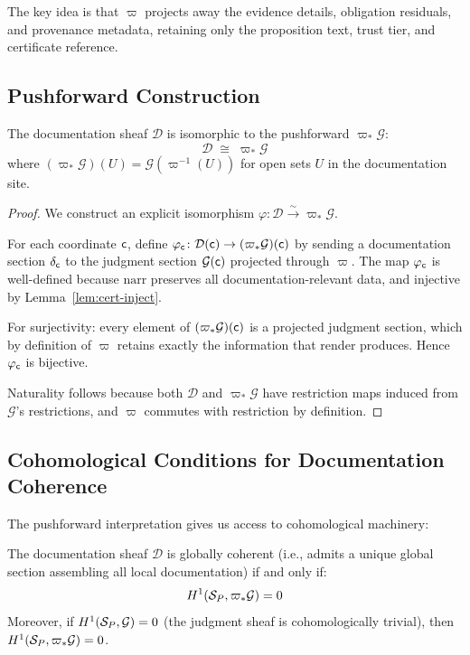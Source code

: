 \documentclass[11pt]{article}
\newcommand{\DocSheaf}{\mathcal{D}}
\newcommand{\DocSection}{\delta}
\newcommand{\NarrFunc}{\mathrm{narr}}
\newcommand{\RenderFunc}{\mathrm{render}}
\newcommand{\ProjFunc}{\varpi}                        %
\begin{document}
The key idea is that $\ProjFunc$ projects away the evidence details,
obligation residuals, and provenance metadata, retaining only the
proposition text, trust tier, and certificate reference.

\subsection{Pushforward Construction}

\begin{theorem}\label{thm:pushforward}
The documentation sheaf $\DocSheaf$ is isomorphic to the pushforward
$\ProjFunc_{*}\mathcal{G}$:
\[
  \DocSheaf \;\cong\; \ProjFunc_{*}\mathcal{G}
\]
where $(\ProjFunc_{*}\mathcal{G})(U) = \mathcal{G}(\ProjFunc^{-1}(U))$
for open sets $U$ in the documentation site.
\end{theorem}

\begin{proof}
We construct an explicit isomorphism
$\varphi \colon \DocSheaf \xrightarrow{\sim} \ProjFunc_{*}\mathcal{G}$.

For each coordinate $\mathsf{c}$, define $\varphi_{\coord} \colon
\DocSheaf(\coord) \to (\ProjFunc_{*}\mathcal{G})(\coord)$ by sending
a documentation section $\DocSection_{\coord}$ to the judgment section
$\mathcal{G}(\mathsf{c})$ projected through $\ProjFunc$.  The map
$\varphi_{\mathsf{c}}$ is well-defined because $\NarrFunc$ preserves all
documentation-relevant data, and injective by
Lemma~\ref{lem:cert-inject}.

For surjectivity: every element of $(\ProjFunc_{*}\mathcal{G})(\coord)$
is a projected judgment section, which by definition of $\ProjFunc$
retains exactly the information that $\RenderFunc$ produces.  Hence
$\varphi_{\mathsf{c}}$ is bijective.

Naturality follows because both $\DocSheaf$ and $\ProjFunc_{*}
\mathcal{G}$ have restriction maps induced from $\mathcal{G}$'s
restrictions, and $\ProjFunc$ commutes with restriction by definition.
\end{proof}

\subsection{Cohomological Conditions for Documentation Coherence}

The pushforward interpretation gives us access to cohomological
machinery:

\begin{theorem}\label{thm:cohom-crit}
The documentation sheaf $\DocSheaf$ is globally coherent (i.e., admits
a unique global section assembling all local documentation) if and only
if:
\[
  \Hcoh{1}(\Site_P, \ProjFunc_{*}\mathcal{G}) = 0
\]
Moreover, if $H^{1}(\mathcal{S}_P, \mathcal{G}) = 0$ (the judgment sheaf
is cohomologically trivial), then
$\Hcoh{1}(\Site_P, \ProjFunc_{*}\mathcal{G}) = 0$.
\end{theorem}
\end{document}
